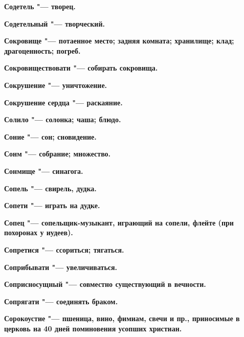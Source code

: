 \begin{mymulticols}{2}
\bfseries Содетель\normalfont{} "--- творец. 




\bfseries Содетельный\normalfont{} "--- творческий. 




\bfseries Сокровище\normalfont{} "--- потаенное место; задняя комната; хранилище; клад; драгоценность; погреб. 




\bfseries Сокровиществовати\normalfont{} "--- собирать сокровища. 




\bfseries Сокрушение\normalfont{} "--- уничтожение. 




\bfseries Сокрушение сердца\normalfont{} "--- раскаяние. 




\bfseries Солило\normalfont{} "--- солонка; чаша; блюдо. 




\bfseries Соние\normalfont{} "--- сон; сновидение. 




\bfseries Сонм\normalfont{} "--- собрание; множество. 




\bfseries Сонмище\normalfont{} "--- синагога. 




\bfseries Сопель\normalfont{} "--- свирель, дудка. 




\bfseries Сопети\normalfont{} "--- играть на дудке. 




\bfseries Сопец\normalfont{} "--- сопельщик-музыкант, играющий на сопели, флейте (при похоронах у иудеев). 




\bfseries Сопретися\normalfont{} "--- ссориться; тягаться. 




\bfseries Соприбывати\normalfont{} "--- увеличиваться. 




\bfseries Соприсносущный\normalfont{} "--- совместно существующий в вечности. 




\bfseries Сопрягати\normalfont{} "--- соединять браком. 




\bfseries Сорокоустие\normalfont{} "--- пшеница, вино, фимиам, свечи и пр., приносимые в церковь на 40 дней поминовения усопших христиан. 





\end{mymulticols}
